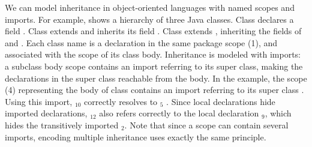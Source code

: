We can model
inheritance in object-oriented languages 
with named scopes and imports.
For example,  shows a hierarchy of three Java classes.
Class  declares a field .
Class  extends  and inherits its field .   
Class  extends , inheriting the fields of  and .
Each class name is a declaration in the same package scope (1),
  and associated with the scope of its class body.
Inheritance is modeled with imports: a subclass body scope contains an import referring to its super class, making the declarations in the super class reachable from the body. In the example, the scope (4) representing the body of class  contains an import referring to its super class . Using this import, $_{10}$ correctly resolves to $_{5}$ . Since local declarations hide imported declarations, $_{12}$ also refers correctly to the local declaration $_{9}$, which hides the transitively imported $_{2}$.
Note that since a scope can contain several imports, encoding multiple inheritance uses exactly the same principle.
